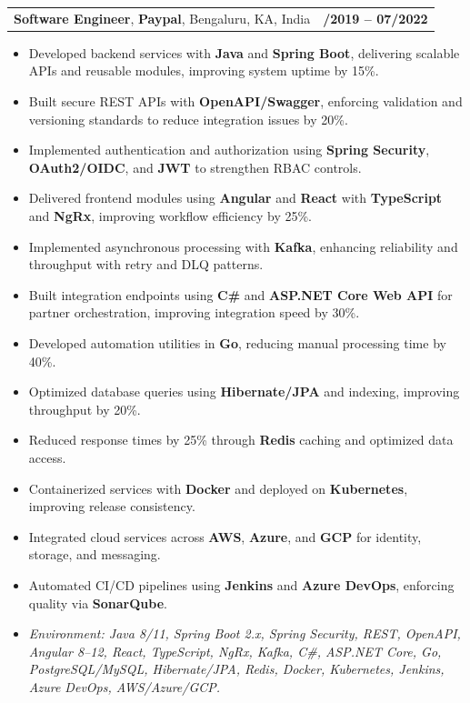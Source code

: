 \documentclass[letterpaper,11pt]{article}
\makeatletter
\newcommand{\resumeItem}[1]{
  \item\footnotesize{
    {#1 \vspace{-2pt}}
  }
}
\newcommand{\resumeSubheading}[4]{
  \vspace{-2pt}\item
    \begin{tabular*}{1.0\textwidth}[t]{l@{\extracolsep{\fill}}r}
      \textbf{\fontsize{10pt}{14pt}\selectfont #3}, \textbf{\fontsize{10pt}{14pt}\selectfont #1}, \fontsize{10pt}{14pt}\selectfont #4 & \textbf{\fontsize{10pt}{14pt}\selectfont #2} \\
    \end{tabular*}\vspace{-7pt}
}
\newcommand{\resumeItemListStart}{\begin{itemize}[leftmargin=*]}
\newcommand{\resumeItemListEnd}{\end{itemize}\vspace{-5pt}}
\makeatother
\begin{document}
\resumeSubheading
{Paypal}{08/2019 -- 07/2022}
{Software Engineer}{Bengaluru, KA, India}
\resumeItemListStart
  \resumeItem{Developed backend services with \textbf{Java} and \textbf{Spring Boot}, delivering scalable APIs and reusable modules, improving system uptime by 15\%.}
  \resumeItem{Built secure REST APIs with \textbf{OpenAPI/Swagger}, enforcing validation and versioning standards to reduce integration issues by 20\%.}
  \resumeItem{Implemented authentication and authorization using \textbf{Spring Security}, \textbf{OAuth2/OIDC}, and \textbf{JWT} to strengthen RBAC controls.}
  \resumeItem{Delivered frontend modules using \textbf{Angular} and \textbf{React} with \textbf{TypeScript} and \textbf{NgRx}, improving workflow efficiency by 25\%.}
  \resumeItem{Implemented asynchronous processing with \textbf{Kafka}, enhancing reliability and throughput with retry and DLQ patterns.}
  \resumeItem{Built integration endpoints using \textbf{C\#} and \textbf{ASP.NET Core Web API} for partner orchestration, improving integration speed by 30\%.}
  \resumeItem{Developed automation utilities in \textbf{Go}, reducing manual processing time by 40\%.}
  \resumeItem{Optimized database queries using \textbf{Hibernate/JPA} and indexing, improving throughput by 20\%.}
  \resumeItem{Reduced response times by 25\% through \textbf{Redis} caching and optimized data access.}
  \resumeItem{Containerized services with \textbf{Docker} and deployed on \textbf{Kubernetes}, improving release consistency.}
  \resumeItem{Integrated cloud services across \textbf{AWS}, \textbf{Azure}, and \textbf{GCP} for identity, storage, and messaging.}
  \resumeItem{Automated CI/CD pipelines using \textbf{Jenkins} and \textbf{Azure DevOps}, enforcing quality via \textbf{SonarQube}.}
  \resumeItem{\textit{Environment: Java 8/11, Spring Boot 2.x, Spring Security, REST, OpenAPI, Angular 8--12, React, TypeScript, NgRx, Kafka, C\#, ASP.NET Core, Go, PostgreSQL/MySQL, Hibernate/JPA, Redis, Docker, Kubernetes, Jenkins, Azure DevOps, AWS/Azure/GCP.}}
\resumeItemListEnd
\end{document}
